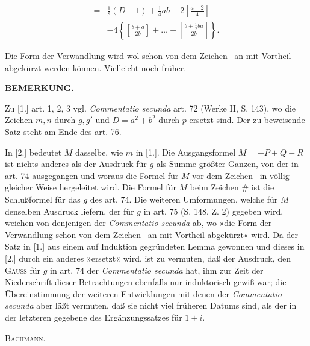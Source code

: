 \[
\begin{aligned}
{}={}&\tfrac18(D-1)+\tfrac14ab+2\left[\frac{a+2}4\right]\\
&-4\left\{\left[\frac{b+a}{2b}\right]+\ldots+\left[\frac{b+\tfrac12ba}{2b}\right]\right\}.
\end{aligned}
\]
\par\noindent\hspace*{\parindent}Die Form der Verwandlung wird wol schon von dem Zeichen \GaussCrossFour\ an mit Vortheil abgekürzt werden können. Vielleicht noch früher.
\clearpage

\begin{center}\textbf{BEMERKUNG.}\end{center}
\begingroup\small
\par\indent Zu [1.] art. 1, 2, 3 vgl. \textit{Commentatio secunda} art. 72 (Werke II, S. 143), wo die Zeichen $m,n$ durch $g,g'$ und $D=a^2+b^2$ durch $p$ ersetzt sind. Der zu beweisende Satz steht am Ende des art. 76.

In [2.] bedeutet $M$ dasselbe, wie $m$ in [1.]. Die Ausgangsformel $M=-P+Q-R$ ist nichts anderes als der Ausdruck für $g$ als Summe größter Ganzen, von der in art. 74 ausgegangen und woraus die Formel für $M$ vor dem Zeichen \GaussCrossFour\ in völlig gleicher Weise hergeleitet wird. Die Formel für $M$ beim Zeichen $\#$ ist die Schlußformel für das $g$ des art. 74. Die weiteren Umformungen, welche für $M$ denselben Ausdruck liefern, der für $g$ in art. 75 (S. 148, Z. 2) gegeben wird, weichen von denjenigen der \textit{Commentatio secunda} ab, wo »die Form der Verwandlung schon von dem Zeichen \GaussCrossFour\ an mit Vortheil abgekürzt« wird. Da der Satz in [1.] aus einem auf Induktion gegründeten Lemma gewonnen und dieses in [2.] durch ein anderes »ersetzt« wird, ist zu vermuten, daß der Ausdruck, den \textsc{Gauss} für $g$ in art. 74 der \textit{Commentatio secunda}  hat, ihm zur Zeit der Niederschrift dieser Betrachtungen ebenfalls nur induktorisch gewiß war; die Übereinstimmung der weiteren Entwicklungen mit denen der \textit{Commentatio secunda} aber läßt vermuten, daß sie nicht viel früheren Datums sind, als der in der letzteren gegebene  des Ergänzungssatzes für $1+i$.
\begin{flushright}\textsc{Bachmann.}\end{flushright}
\ClosingRule\clearpage\endgroup
